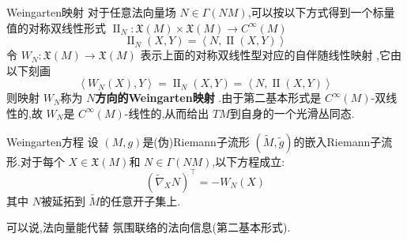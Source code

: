 \documentclass[../../几何与拓扑.tex]{subfiles}
\begin{document}
\begin{definition}{Weingarten映射}
    对于任意法向量场 \(  N \in  \Gamma \left( NM \right)   \),可以按以下方式得到一个标量值的对称双线性形式 \(  \operatorname{II}_{N}: \mathfrak{X}\left( M \right)\times \mathfrak{X}\left( M \right)\to C^{\infty}\left( M \right)     \) \[
    \operatorname{II}_{N}\left( X,Y \right)= \left<N,\operatorname{II}\left( X,Y \right)  \right> 
    \]令 \(  W_{N}: \mathfrak{X}\left( M \right)\to \mathfrak{X}\left( M \right)    \)   表示上面的对称双线性型对应的自伴随线性映射 ,它由以下刻画 \[
    \left<W_{N}\left( X \right),Y  \right>= \operatorname{II}_{N}\left( X,Y \right)= \left<N,\operatorname{II}\left( X,Y \right)  \right> 
    \]则映射 \(  W_{N}  \)称为 \textbf{\(  N  \)方向的Weingarten映射 }.由于第二基本形式是 \(  C^{\infty}\left( M \right)   \)-双线性的,故 \(  W_{N}  \)是 \(  C^{\infty}\left( M \right)   \)-线性的,从而给出 \(  TM  \)到自身的一个光滑丛同态.     
\end{definition}


\begin{proposition}{Weingarten方程}
    设 \(  \left( M,g \right)   \)是(伪)Riemann子流形 \(  \left( \tilde{M}, \tilde{g}  \right)   \)的嵌入Riemann子流形.对于每个 \(  X \in \mathfrak{X}\left( M \right)   \)和 \(  N \in  \Gamma \left( NM \right)   \),以下方程成立: \[
    \left(  \tilde{\nabla} _{X}N \right)^{\top}= -W_{N}\left( X \right)  
    \]  其中 \(  N  \)被延拓到 \(  \tilde{M}  \)的任意开子集上.    
\end{proposition}
\begin{remark}
    可以说,法向量能代替 氛围联络的法向信息(第二基本形式).
\end{remark}
\end{document}
